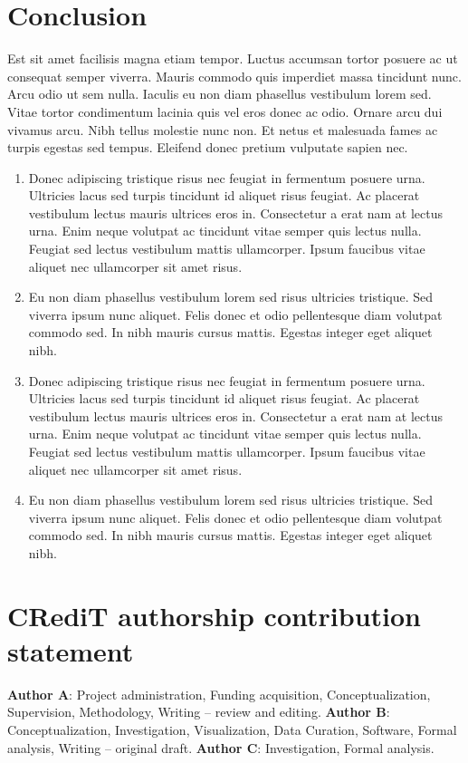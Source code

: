 \documentclass[12pt]{article}
\begin{document}
\section{Conclusion}

\par Est sit amet facilisis magna etiam tempor. Luctus accumsan tortor posuere ac ut consequat semper viverra. Mauris commodo quis imperdiet massa tincidunt nunc. Arcu odio ut sem nulla. Iaculis eu non diam phasellus vestibulum lorem sed. Vitae tortor condimentum lacinia quis vel eros donec ac odio. Ornare arcu dui vivamus arcu. Nibh tellus molestie nunc non. Et netus et malesuada fames ac turpis egestas sed tempus. Eleifend donec pretium vulputate sapien nec.
\begin{enumerate}
  \item Donec adipiscing tristique risus nec feugiat in fermentum posuere urna. Ultricies lacus sed turpis tincidunt id aliquet risus feugiat. Ac placerat vestibulum lectus mauris ultrices eros in. Consectetur a erat nam at lectus urna. Enim neque volutpat ac tincidunt vitae semper quis lectus nulla. Feugiat sed lectus vestibulum mattis ullamcorper. Ipsum faucibus vitae aliquet nec ullamcorper sit amet risus. 
  \item Eu non diam phasellus vestibulum lorem sed risus ultricies tristique. Sed viverra ipsum nunc aliquet. Felis donec et odio pellentesque diam volutpat commodo sed. In nibh mauris cursus mattis. Egestas integer eget aliquet nibh. 
  \item Donec adipiscing tristique risus nec feugiat in fermentum posuere urna. Ultricies lacus sed turpis tincidunt id aliquet risus feugiat. Ac placerat vestibulum lectus mauris ultrices eros in. Consectetur a erat nam at lectus urna. Enim neque volutpat ac tincidunt vitae semper quis lectus nulla. Feugiat sed lectus vestibulum mattis ullamcorper. Ipsum faucibus vitae aliquet nec ullamcorper sit amet risus. 
  \item Eu non diam phasellus vestibulum lorem sed risus ultricies tristique. Sed viverra ipsum nunc aliquet. Felis donec et odio pellentesque diam volutpat commodo sed. In nibh mauris cursus mattis. Egestas integer eget aliquet nibh. 
\end{enumerate}

\section*{CRediT authorship contribution statement}

\noindent 
\textbf{Author A}: Project administration, Funding acquisition, Conceptualization, Supervision, Methodology, Writing – review and editing. \textbf{Author B}: Conceptualization, Investigation, Visualization, Data Curation, Software, Formal analysis, Writing – original draft. \textbf{Author C}: Investigation, Formal analysis.
\end{document}
